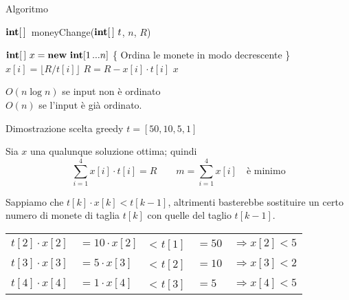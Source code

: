 \begin{frame}{Algoritmo}
	
\vspace{-12pt}
\begin{Procedure}
\caption[A]{$\INTARRAY$\ \textsf{moneyChange}($\INTARRAY\ t$, \INTEGER $n$, \INTEGER $R$)}
$\INTARRAY\ x = \NEW\ \INTEGER[1 \mydots n]$\;
\{ Ordina le monete in modo decrescente \}\;
 {
  $x[i] = \lfloor R/t[i] \rfloor$\;
  $R = R - x[i] \cdot t[i]$\;
}
\Return $x$\;
\end{Procedure}
	
 $O(n \log n)$ se input non è ordinato\\
\makebox[2.5cm][l]{} $O(n)$ se l'input è già ordinato.

\end{frame}

\begin{frame}{Dimostrazione scelta greedy $t = [50,10,5,1]$}

\vspace{-9pt}
\BIL
\item Sia $x$ una qualunque soluzione ottima; quindi
\[
	\sum_{i=1}^4 x[i] \cdot t[i] = R \qquad m = \sum_{i=1}^4 x[i] \quad \textrm{è minimo}
\]

\item Sappiamo che $t[k] \cdot x[k] < t[k-1]$, altrimenti basterebbe sostituire un certo numero di monete di taglia $t[k]$ con quelle del taglio $t[k-1]$.

\bigskip
\begin{tabular}{lllll}
    $t[2] \cdot x[2]$ & $= 10 \cdot x[2]$ &< $t[1]$ & $= 50$ & $\Rightarrow x[2] < 5$\\
    $t[3] \cdot x[3]$ & $= 5 \cdot x[3]$ &< $t[2]$ & $= 10$ & $\Rightarrow x[3] < 2$\\
    $t[4] \cdot x[4]$ & $= 1 \cdot x[4]$ &< $t[3]$ & $= 5$ & $\Rightarrow x[4] < 5$\\
\end{tabular}
\EIL

\end{frame}

